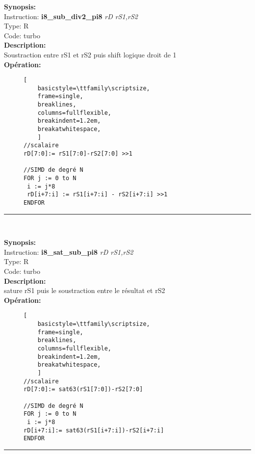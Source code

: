 {\scriptsize
\textbf{Synopsis:}\\
Instruction: \textbf{i8\_sub\_div2\_pi8 } \textit{rD rS1,rS2}\\
Type: R\\
Code: turbo\\
\textbf{Description:}\\
Soustraction entre rS1 et rS2 puis shift logique droit de 1\\
\textbf{Opération:}\\
    \begin{figure}[H]
    \begin{lstlisting}[
    basicstyle=\ttfamily\scriptsize,
    frame=single,
    breaklines,
    columns=fullflexible,
    breakindent=1.2em,
    breakatwhitespace,
    ]
//scalaire
rD[7:0]:= rS1[7:0]-rS2[7:0] >>1
    
//SIMD de degré N
FOR j := 0 to N    
 i := j*8    
 rD[i+7:i] := rS1[i+7:i] - rS2[i+7:i] >>1  
ENDFOR
\end{lstlisting}
\end{figure}
}
\rule{8cm}{0.4pt}\\
{\scriptsize
\textbf{Synopsis:}\\
Instruction: \textbf{i8\_sat\_sub\_pi8 } \textit{rD rS1,rS2}\\
Type: R\\
Code: turbo\\
\textbf{Description:}\\
sature rS1 puis le soustraction entre le résultat et rS2\\
\textbf{Opération:}\\
    \begin{figure}[H]
    \begin{lstlisting}[
    basicstyle=\ttfamily\scriptsize,
    frame=single,
    breaklines,
    columns=fullflexible,
    breakindent=1.2em,
    breakatwhitespace,
    ]
//scalaire
rD[7:0]:= sat63(rS1[7:0])-rS2[7:0]
    
//SIMD de degré N
FOR j := 0 to N    
 i := j*8    
rD[i+7:i]:= sat63(rS1[i+7:i])-rS2[i+7:i]
ENDFOR
\end{lstlisting}
\end{figure}
}
\rule{8cm}{0.4pt}\\
